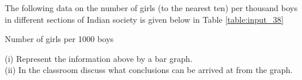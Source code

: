  The following data on the number of girls (to the nearest ten) per thousand boys in different sections of Indian society is given below in Table \ref{table:input_38}

 \begin{table}[ht!]
\centering

\caption{Number of girls per 1000 boys}
\label{table:input_38}
\end{table}
(i) Represent the information above by a bar graph.\\
(ii) In the classroom discuss what conclusions can be arrived at from the graph.\\
